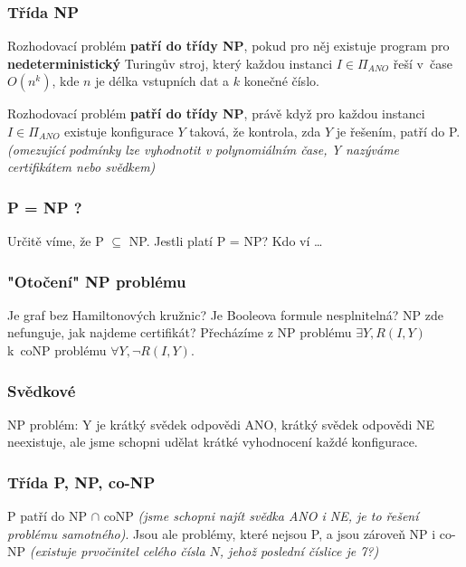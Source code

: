 \subsubsection*{Třída NP}

Rozhodovací problém \textbf{patří do třídy NP}, pokud pro něj existuje program pro \textbf{nedeterministický} Turingův stroj, který každou instanci $I \in \Pi_{ANO}$ řeší v~čase $O(n^k)$, kde $n$ je délka vstupních dat a $k$ konečné číslo.

\vspace{4pt}
\noindent Rozhodovací problém \textbf{patří do třídy NP}, právě když pro každou instanci $I \in \Pi_{ANO}$ existuje konfigurace $Y$ taková, že kontrola, zda $Y$ je řešením, patří do P. \textit{(omezující podmínky lze vyhodnotit v polynomiálním čase, Y nazýváme certifikátem nebo svědkem)}

\subsubsection*{P = NP ?}

Určitě víme, že P $\subseteq$ NP. Jestli platí P = NP? Kdo ví \ldots

\subsubsection*{"Otočení" NP problému}

Je graf bez Hamiltonových kružnic? Je Booleova formule nesplnitelná? NP zde nefunguje, jak najdeme certifikát? Přecházíme z NP problému $\exists Y, R(I, Y)$ k~coNP problému $\forall Y, \neg R(I, Y)$.

\subsubsection*{Svědkové}

NP problém: Y je krátký svědek odpovědi ANO, krátký svědek odpovědi NE neexistuje, ale jsme schopni udělat krátké vyhodnocení každé konfigurace.

\subsubsection{Třída P, NP, co-NP}

P patří do NP $\cap$ coNP \textit{(jsme schopni najít svědka ANO i NE, je to řešení problému samotného)}. Jsou ale problémy, které nejsou P, a jsou zároveň NP i co-NP \textit{(existuje prvočinitel celého čísla $N$, jehož poslední číslice je 7?)}

